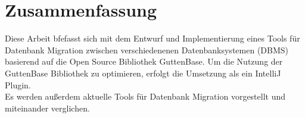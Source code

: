 \section*{Zusammenfassung}

Diese Arbeit bfefasst sich mit dem Entwurf und Implementierung eines Tools für Datenbank Migration zwischen verschiedenenen Datenbanksystemen (DBMS) basierend auf die Open Source Bibliothek GuttenBase.
Um die Nutzung der GuttenBase Bibliothek zu optimieren, erfolgt die Umsetzung als ein IntelliJ Plugin.\\
Es werden außerdem aktuelle Tools für Datenbank Migration vorgestellt und miteinander verglichen.





